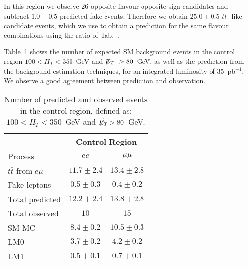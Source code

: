 In this region we observe $26$ opposite flavour opposite sign candidates and
subtract $1.0\pm0.5$ predicted fake events. Therefore we obtain $25.0\pm0.5$ $t\bar{t}$-
like candidate events, which we use to obtain a prediction for the same flavour combinations
using the ratio of Tab.~\label{tab:tnp_eff}.

Table~\ref{tab:OFexpect} shows the number of expected SM background events in the control region $100 < H_T < 350$~GeV 
and $\displaystyle{\not} E_T~>80$~GeV, as well as the prediction from the background estimation techniques, for an integrated
luminosity of 35~pb${}^{-1}$. We observe a good agreement between prediction and observation.

\begin{table}[hbt]
\begin{center}
\caption{\label{tab:OFexpect}Number of predicted and observed events in the control region, defined as: $100 < H_T < 350$~GeV and $\not\!\!\vec{E}_{T} > 80$~GeV.}
\begin{tabular}{l|cc}
\hline
                       & \multicolumn{2}{c}{Control Region}               \\
\hline 
Process                & $ee$          & $\mu\mu$        \\
\hline
$t\bar{t}$ from $e\mu$ & $11.7\pm 2.4$ & $13.4\pm 2.8$   \\
Fake leptons           & $0.5\pm 0.3$  & $0.4\pm0.2$                  \\
\hline
Total predicted        & $12.2\pm 2.4$ & $13.8 \pm 2.8$  \\
\hline\hline
Total observed         & $10$          & $15$          \\
\hline \hline
SM MC         & $8.4\pm 0.2$  & $10.5 \pm 0.3$    \\
LM0                    &  $3.7\pm0.2$  & $4.2\pm0.2$     \\
LM1                    &  $0.5\pm0.1$  & $0.7\pm0.1$     \\

\hline
\end{tabular}
\end{center}
\end{table}


